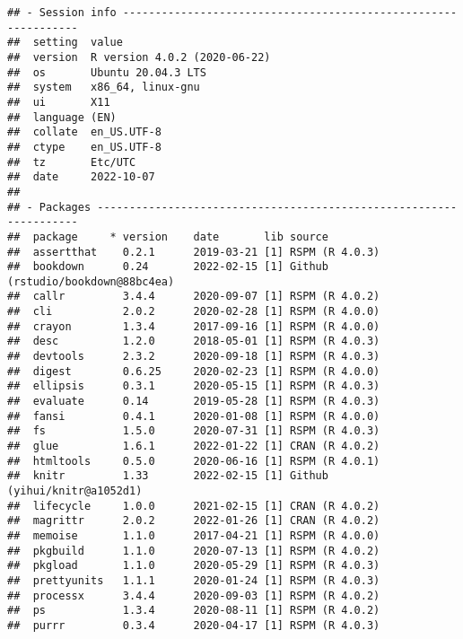 \documentclass[
]{book}
\begin{document}
\begin{verbatim}
## - Session info ---------------------------------------------------------------
##  setting  value                       
##  version  R version 4.0.2 (2020-06-22)
##  os       Ubuntu 20.04.3 LTS          
##  system   x86_64, linux-gnu           
##  ui       X11                         
##  language (EN)                        
##  collate  en_US.UTF-8                 
##  ctype    en_US.UTF-8                 
##  tz       Etc/UTC                     
##  date     2022-10-07                  
## 
## - Packages -------------------------------------------------------------------
##  package     * version    date       lib source                            
##  assertthat    0.2.1      2019-03-21 [1] RSPM (R 4.0.3)                    
##  bookdown      0.24       2022-02-15 [1] Github (rstudio/bookdown@88bc4ea) 
##  callr         3.4.4      2020-09-07 [1] RSPM (R 4.0.2)                    
##  cli           2.0.2      2020-02-28 [1] RSPM (R 4.0.0)                    
##  crayon        1.3.4      2017-09-16 [1] RSPM (R 4.0.0)                    
##  desc          1.2.0      2018-05-01 [1] RSPM (R 4.0.3)                    
##  devtools      2.3.2      2020-09-18 [1] RSPM (R 4.0.3)                    
##  digest        0.6.25     2020-02-23 [1] RSPM (R 4.0.0)                    
##  ellipsis      0.3.1      2020-05-15 [1] RSPM (R 4.0.3)                    
##  evaluate      0.14       2019-05-28 [1] RSPM (R 4.0.3)                    
##  fansi         0.4.1      2020-01-08 [1] RSPM (R 4.0.0)                    
##  fs            1.5.0      2020-07-31 [1] RSPM (R 4.0.3)                    
##  glue          1.6.1      2022-01-22 [1] CRAN (R 4.0.2)                    
##  htmltools     0.5.0      2020-06-16 [1] RSPM (R 4.0.1)                    
##  knitr         1.33       2022-02-15 [1] Github (yihui/knitr@a1052d1)      
##  lifecycle     1.0.0      2021-02-15 [1] CRAN (R 4.0.2)                    
##  magrittr      2.0.2      2022-01-26 [1] CRAN (R 4.0.2)                    
##  memoise       1.1.0      2017-04-21 [1] RSPM (R 4.0.0)                    
##  pkgbuild      1.1.0      2020-07-13 [1] RSPM (R 4.0.2)                    
##  pkgload       1.1.0      2020-05-29 [1] RSPM (R 4.0.3)                    
##  prettyunits   1.1.1      2020-01-24 [1] RSPM (R 4.0.3)                    
##  processx      3.4.4      2020-09-03 [1] RSPM (R 4.0.2)                    
##  ps            1.3.4      2020-08-11 [1] RSPM (R 4.0.2)                    
##  purrr         0.3.4      2020-04-17 [1] RSPM (R 4.0.3)                    

\end{verbatim}
\end{document}
